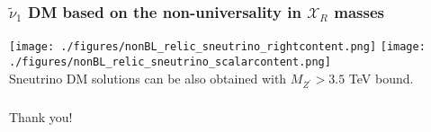 \documentclass[hyperref={bookmarks=false},aspectratio=169]{beamer}
\def\singR{\mathcal{X}_{R}}
\begin{document}
\begin{frame}
\frametitle{$\widetilde{\nu}_1$ DM based on the non-universality in $\singR$ masses}

\centering
\texttt{[image: ./figures/nonBL\_relic\_sneutrino\_rightcontent.png]} 
\texttt{[image: ./figures/nonBL\_relic\_sneutrino\_scalarcontent.png]} \\

Sneutrino DM solutions can be also obtained with $M_{Z^{\prime}} > 3.5 $ TeV bound.
\end{frame}



\begin{frame}
\frametitle{}
\centering
{\Huge Thank you!}

\end{frame}
\end{document}
